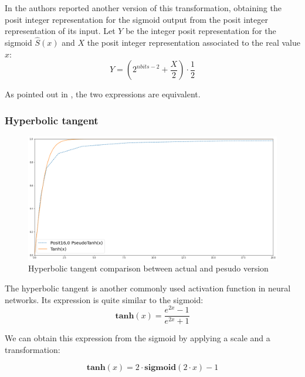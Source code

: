 In \cite{gustafson2017beating} the authors reported another version of this transformation, obtaining the posit integer representation for the sigmoid output from the posit integer representation of its input. Let $Y$ be the integer posit representation for the sigmoid $\hat{S}(x)$ and $X$ the posit integer representation associated to the real value $x$:
\begin{equation}\label{eqn:pseudoSigmoidPosit0}
    Y = \left ( 2^{nbits - 2} + \frac{X}{2} \right ) \cdot \frac{1}{2}
\end{equation}

As pointed out in \cite{coco2020sensors}, the two expressions are equivalent.

\subsubsection{Hyperbolic tangent}

\begin{figure}
    \centering
    \includegraphics[width=\linewidth]{img/tanhPosit160.png}
    \caption{Hyperbolic tangent comparison between actual and pesudo version}
    \label{fig:pseudoTanhPosit0}
\end{figure}

The hyperbolic tangent is another commonly used activation function in neural networks. Its expression is quite similar to the sigmoid:
\begin{equation}
    \mathbf{tanh}(x) = \frac{e^{2x}-1}{e^{2x}+1} 
\end{equation}

We can obtain this expression from the sigmoid by applying a scale and a transformation:

\begin{equation}
   \mathbf{tanh}(x) =  2 \cdot \mathbf{sigmoid}(2 \cdot x) - 1
\end{equation}

